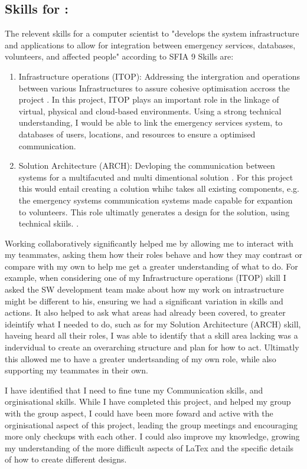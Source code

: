 \documentclass[a4paper, 11pt]{report}
\begin{document}
\subsection{Skills for \majA: \studA}

The relevent skills for a computer scientist to "develops the system infrastructure and applications to allow for integration between emergency services, databases, volunteers, and affected people" according to SFIA 9 Skills are:

\begin{enumerate}
    \item Infrastructure operations (ITOP): Addressing the intergration and operations between various Infrastructures to assure cohesive optimisation accross the project \cite{palma2023}. In this project, ITOP plays an important role in the linkage of virtual, physical and cloud-based environments. Using a strong technical understanding, I  would be able to link the emergency services system, to databases of users, locations, and resources to ensure a optimised communication. 
    \item Solution Architecture (ARCH): Devloping the communication between systems for a multifacuted and multi dimentional solution \cite{palma2023}. For this project this would entail creating a colution whihc takes all existing components, e.g. the emergency systems communication systems made capable for expantion to volunteers. This role ultimatly generates a design for the solution, using technical skiils. .
\end{enumerate}

Working collaboratively significantly helped me by allowing me to interact with my teammates, asking them how their roles behave and how they may contrast or compare with my own to help me get a greater understanding of what to do. For example, when considering one of my Infrastructure operations (ITOP) skill I asked the SW development team make about how my work on intrastructure might be different to his, ensuring we had a significant variation in skills and actions. It also helped to ask what areas had already been covered, to greater ideintify what I needed to do, such as for my Solution Architecture (ARCH) skill, haveing heard all their roles, I was able to identify that a skill area lacking was a indervidual to create an overarching structure and plan for how to act. Ultimatly this allowed me to have a greater undertsanding of my own role, while also  supporting my teammates in their own. 

I have identified that I need to fine tune my Communication skills, and orginisational skills. While I have completed this project, and helped my group with the group aspect, I could have been more foward and active with the orginisational aspect of this project, leading the group meetings and encouraging more only checkups with each other. I could also improve my knowledge, growing my understanding of the more difficult aspects of LaTex and the specific details of how to create different designs. 
\end{document}
